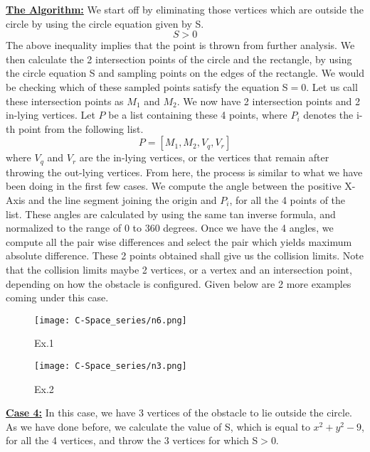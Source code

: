 \documentclass[12pt]{article}
\begin{document}
\newline
\underline{\textbf{The Algorithm:}}
\newline
We start off by eliminating those vertices which are outside the circle by using the circle equation given by S.
\newline
$$S>0$$The above inequality implies that the point is thrown from further analysis.
\newline
We then calculate the 2 intersection points of the circle and the rectangle, by using the circle equation S and sampling points on the edges of the rectangle. We would be checking which of these sampled points satisfy the equation S$=$0. Let us call these intersection points as $M_1$ and $M_2$. We now have 2 intersection points and 2 in-lying vertices. Let $P$ be a list containing these 4 points, where $P_i$ denotes the i-th point from the following list.
$$P=[M_1, M_2, V_q, V_r]$$
where $V_q$ and $V_r$ are the in-lying vertices, or the vertices that remain after throwing the out-lying vertices.
From here, the process is similar to what we have been doing in the first few cases. We compute the angle between the positive X-Axis and the line segment joining the origin and $P_i$, for all the 4 points of the list. These angles are calculated by using the same tan inverse formula, and normalized to the range of 0 to 360 degrees. Once we have the 4 angles, we compute all the pair wise differences and select the pair which yields maximum absolute difference. These 2 points obtained shall give us the collision limits. Note that the collision limits maybe 2 vertices, or a vertex and an intersection point, depending on how the obstacle is configured. Given below are 2 more examples coming under this case.
\begin{figure}[h!]
    \centering
    \begin{minipage}{0.44\textwidth}
        \centering
        \texttt{[image: C-Space\_series/n6.png]}
        \caption{Ex.1}
        \label{fig:n6}
    \end{minipage}
    \hfill
    \begin{minipage}{0.44\textwidth}
        \centering
        \texttt{[image: C-Space\_series/n3.png]}
        \caption{Ex.2}
        \label{fig:n3}
    \end{minipage}
\end{figure}
\newline
\underline{\textbf{Case 4:}}
\newline
In this case, we have 3 vertices of the obstacle to lie outside the circle. As we have done before, we calculate the value of S, which is equal to $x^2 + y^2 - 9$, for all the 4 vertices, and throw the 3 vertices for which S$>$0.
\end{document}
